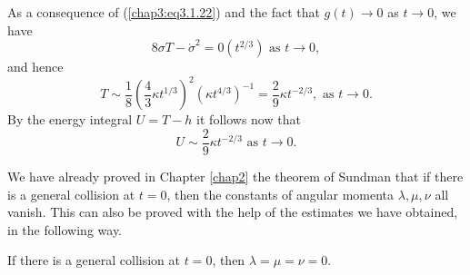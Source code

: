 As a consequence of (\ref{chap3:eq3.1.22}) and the fact that $g(t) \to
0$ as $t \to 0$, we have 
\begin{equation*}
8 \sigma T - \dot{\sigma}^2 = 0 (t^{2/3}) \text{ as } t \to
0,\tag{3.1.34}\label{chap3:eq3.1.34} 
\end{equation*}
and hence\pageoriginale
\begin{equation*}
T \sim\frac{1}{8} (\frac{4}{3} \kappa t^{1/3})^2 (\kappa t^{4/3})^{-1}
= \frac{2}{9} \kappa t^{-2/3}, \text{ as } t \to
0. \tag{3.1.35}\label{chap3:eq3.1.35} 
\end{equation*}
By the energy integral $U = T -h$ it follows now that
\begin{equation*}
U \sim \frac{2}{9} \kappa t^{-2/3} \text{ as } t\to
0. \tag{3.1.36}\label{chap3:eq3.1.36} 
\end{equation*}

We have already proved in Chapter \ref{chap2} the theorem of Sundman
that if there is a general collision at $t=0$, then the constants of
angular momenta $\lambda,\mu, \nu$ all vanish. This can also be proved
with the help of the estimates we have obtained, in the following
way. 

\begin{subtheorem}[Sundman]\label{chap3:thm3.1.3}
If there is a general collision at $t = 0$, then $\lambda = \mu = \nu
= 0$. 
\end{subtheorem}

